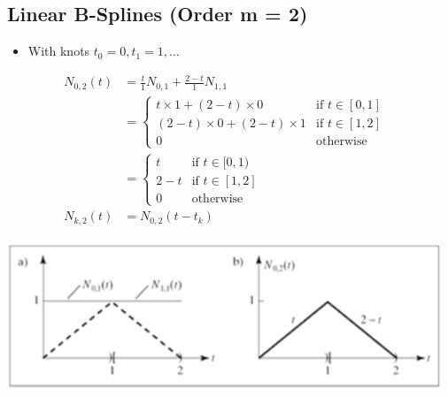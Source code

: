 \documentclass{article}
\begin{document}
\subsection*{Linear B-Splines (Order m = 2)}
\begin{itemize}
    \item With knots $t_0 = 0, t_1 = 1, \dots$
\end{itemize}
\begin{align*}
    N_{0, 2}(t) &= \frac{t}{1} N_{0, 1} + \frac{2 - t}{1}N_{1, 1}\\
    &= \begin{cases}t \times 1 + (2 - t) \times 0 & \text{if } t \in [0, 1] \\ (2 - t) \times 0 + (2 - t) \times 1 & \text{if } t \in [1, 2] \\ 0 & \text{otherwise}\end{cases}\\
    &= \begin{cases} t & \text{if } t \in [0, 1) \\ 2 - t & \text{if } t \in [1, 2] \\ 0 & \text{otherwise}\end{cases}
    & \\
    N_{k, 2}(t) &= N_{0, 2}(t - t_k)
\end{align*}    
\begin{center}
    \includegraphics*[scale=0.8]{W3_15.png}
\end{center}
\end{document}
